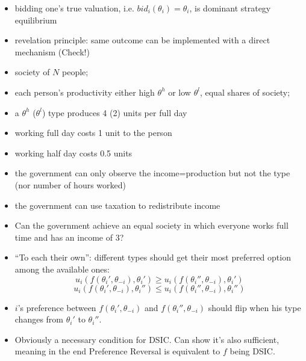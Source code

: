 \documentclass[english]{beamer}		%
\def\lyxframeend{} %
\begin{document}
\begin{example}
	\begin{itemize}
		\item bidding one's true valuation, i.e. $bid_{i}(\theta_{i})=\theta_{i}$, is dominant strategy equilibrium
		\item revelation principle: same outcome can be implemented with a direct mechanism (Check!)
	\end{itemize}
\end{example}
\lyxframeend


\begin{example}[Communism]
	\begin{itemize}
		\item society of $N$ people;
		\item each person's productivity either high $\theta^h$ or low $\theta^l$, equal shares of society;
		\item a $\theta^{h}$ ($\theta^{l}$) type produces 4 (2) units per full day
		\item working full day costs 1 unit to the person
		\item working half day costs 0.5 units
		\item the government can only observe the income=production but not the type (nor number of hours worked)
		\item the government can use taxation to redistribute income
		\pause
		\item Can the government achieve an equal society in which everyone works full time and has an income of 3?
	\end{itemize}
\end{example}
\vspace{-2em}
\lyxframeend


\begin{itemize}
	\item ``To each their own'': different types should get their most preferred option among the available ones:
	$$ u_{i}(f(\theta_{i}', \theta_{-i}), \theta_{i}') \geq u_{i}(f(\theta_{i}'', \theta_{-i}), \theta_{i}')$$
	$$ u_{i}(f(\theta_{i}', \theta_{-i}), \theta_{i}'') \leq u_{i}(f(\theta_{i}'', \theta_{-i}), \theta_{i}'')$$
	\item $i$'s preference between $f(\theta_{i}', \theta_{-i})$ and $f(\theta_{i}'', \theta_{-i})$ should flip when his type changes from $\theta_i'$ to $\theta_i''$.
	\item Obviously a necessary condition for DSIC. Can show it's also sufficient, meaning in the end Preference Reversal is equivalent to $f$ being DSIC.
\end{itemize}
\lyxframeend
\end{document}
